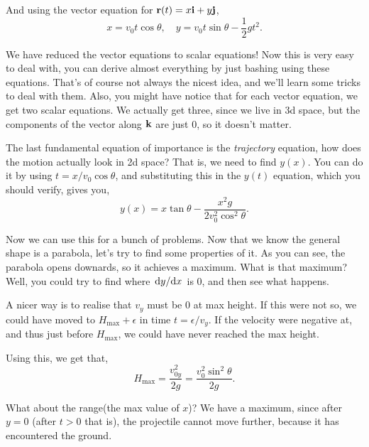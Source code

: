     And using the vector equation for $\mathbf{\boldsymbol{r}}(t) = x\mathbf{\boldsymbol{i}} + y\mathbf{\boldsymbol{j}}$,
    \begin{equation}
        x = v_0t\cos\theta, \quad y = v_0t\sin\theta - \frac{1}{2}gt^2.        
    \end{equation}
    

    We have reduced the vector equations to scalar equations! Now this is very easy
    to deal with, you can derive almost everything by just bashing using these equations.
    That's of course not always the nicest idea, and we'll learn some tricks to deal with them. Also, you might have notice that for each vector equation, we get two scalar
    equations. We actually get three, since we live in 3d space, but the components of 
    the vector along $\mathbf{\boldsymbol{k}}$ are just $0$, so it doesn't matter.

    The last fundamental equation of importance is the \textit{trajectory} equation,
    how does the motion actually look in 2d space? That is, we need to find $y(x)$.
    You can do it by using $t = x/v_0\cos\theta$, and substituting this in the $y(t)$
    equation, which you should verify, gives you,
    \begin{equation}
        y(x) = x\tan\theta - \frac{x^2g}{2v_0^2\cos^2\theta}.        
    \end{equation}
    
    Now we can use this for a bunch of problems. Now that we know the general shape is a parabola,
    let's try to find some properties of it. As you can see, the parabola opens downards, so it
    achieves a maximum. What is that maximum? Well, you could try to find where $\dv*{y}{x}$ is 0,
    and then see what happens. 
    
    A nicer way is to realise that $v_y$ must be 0 at max height. If this were not so, 
    we could have moved to $H_{\text{max}} + \epsilon$ in time $t = \epsilon/v_y$. If the velocity were 
    negative at, and thus just before $H_{\text{max}}$, we could have never reached the max height.

    Using this, we get that,
    \begin{equation}
        H_{\text{max}} = \frac{v_{0y}^2}{2g} = \boxed{\frac{v_0^2\sin^2\theta}{2g}.}
    \end{equation}

    What about the range(the max value of $x$)? We have a maximum, since after $y = 0$ (after $t > 0$ that is), the projectile cannot
    move further, because it has encountered the ground. 
    
